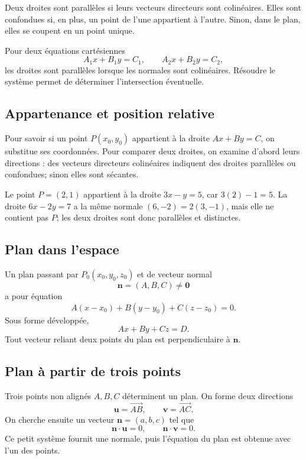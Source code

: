 \documentclass[12pt,a4paper,openany]{book}
\newcommand{\vect}[1]{\overrightarrow{#1}}
\begin{document}
Deux droites sont parallèles si leurs vecteurs directeurs sont colinéaires. Elles sont confondues si, en plus, un point de l'une appartient à l'autre. Sinon, dans le plan, elles se coupent en un point unique.

Pour deux équations cartésiennes
\[
A_1x+B_1y=C_1,
\qquad
A_2x+B_2y=C_2,
\]
les droites sont parallèles lorsque les normales sont colinéaires. Résoudre le système permet de déterminer l'intersection éventuelle.

\subsection{Appartenance et position relative}

Pour savoir si un point $P(x_0,y_0)$ appartient à la droite $Ax+By=C$, on substitue ses coordonnées. Pour comparer deux droites, on examine d'abord leurs directions : des vecteurs directeurs colinéaires indiquent des droites parallèles ou confondues; sinon elles sont sécantes.

\begin{examplebox}
Le point $P=(2,1)$ appartient à la droite $3x-y=5$, car $3(2)-1=5$. La droite $6x-2y=7$ a la même normale $(6,-2)=2(3,-1)$, mais elle ne contient pas $P$; les deux droites sont donc parallèles et distinctes.
\end{examplebox}

\subsection{Plan dans l'espace}

Un plan passant par $P_0(x_0,y_0,z_0)$ et de vecteur normal
\[
\mathbf n=(A,B,C)\neq\mathbf0
\]
a pour équation
\[
A(x-x_0)+B(y-y_0)+C(z-z_0)=0.
\]
Sous forme développée,
\[
Ax+By+Cz=D.
\]
Tout vecteur reliant deux points du plan est perpendiculaire à $\mathbf n$.

\subsection{Plan à partir de trois points}

Trois points non alignés $A,B,C$ déterminent un plan. On forme deux directions
\[
\mathbf u=\vect{AB},
\qquad
\mathbf v=\vect{AC}.
\]
On cherche ensuite un vecteur $\mathbf n=(a,b,c)$ tel que
\[
\mathbf n\cdot\mathbf u=0,
\qquad
\mathbf n\cdot\mathbf v=0.
\]
Ce petit système fournit une normale, puis l'équation du plan est obtenue avec l'un des points.
\end{document}
